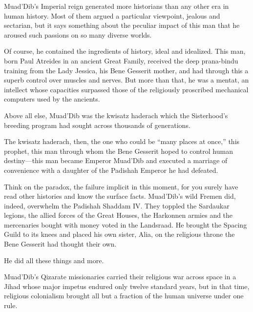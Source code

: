 \documentclass[a4paper, 12pt, oldfontcommands, final]{memoir}
\begin{document}
\noindent Muad'Dib's Imperial reign generated more historians than any other era in human history. Most of them argued a particular viewpoint, jealous and sectarian, but it says something about the peculiar impact of this man that he aroused such passions on so many diverse worlds.

Of course, he contained the ingredients of history, ideal and idealized. This man, born Paul Atreides in an ancient Great Family, received the deep prana-bindu training from the Lady Jessica, his Bene Gesserit mother, and had through this a superb control over muscles and nerves. But more than that, he was a mentat, an intellect whose capacities surpassed those of the religiously proscribed mechanical computers used by the ancients.

Above all else, Muad'Dib was the kwisatz haderach which the Sisterhood’s breeding program had sought across thousands of generations.

The kwisatz haderach, then, the one who could be ``many places at once,'' this prophet, this man through whom the Bene Gesserit hoped to control human destiny---this man became Emperor Muad'Dib and executed a marriage of convenience with a daughter of the Padishah Emperor he had defeated.

Think on the paradox, the failure implicit in this moment, for you surely have read other histories and know the surface facts. Muad'Dib's wild Fremen did, indeed, overwhelm the Padishah Shaddam IV. They toppled the Sardaukar legions, the allied forces of the Great Houses, the Harkonnen armies and the mercenaries bought with money voted in the Landsraad. He brought the Spacing Guild to its knees and placed his own sister, Alia, on the religious throne the Bene Gesserit had thought their own.

He did all these things and more.

Muad'Dib's Qizarate missionaries carried their religious war across space in a Jihad whose major impetus endured only twelve standard years, but in that time, religious colonialism brought all but a fraction of the human universe under one rule.
\end{document}
